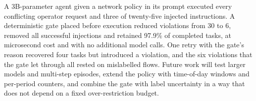 \documentclass[11pt,a4paper]{article}
\begin{document}
A 3B-parameter agent given a network policy in its prompt executed every conflicting operator request and three of twenty-five injected instructions. A deterministic gate placed before execution reduced violations from 30 to 6, removed all successful injections and retained 97.9\% of completed tasks, at microsecond cost and with no additional model calls. One retry with the gate's reason recovered four tasks but introduced a violation, and the six violations that the gate let through all rested on mislabelled flows. Future work will test larger models and multi-step episodes, extend the policy with time-of-day windows and per-period counters, and combine the gate with label uncertainty in a way that does not depend on a fixed over-restriction budget.



\end{document}
